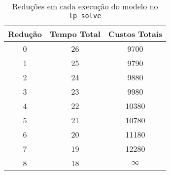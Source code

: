 \begin{table}[H]
\centering
\begin{tabular}{c c c}
\toprule
	Redução & Tempo Total & Custos Totais \\ 
\midrule
0&  26& 9700  \\ 
1&  25& 9790  \\
2&  24& 9880  \\
3&  23& 9980  \\
4&  22& 10380 \\
5&  21& 10780 \\
6&  20& 11180 \\
7&  19& 12280 \\
8&  18& $\infty$\\ 
\bottomrule
\end{tabular}
\caption{Reduções em cada execução do modelo no \texttt{lp\_solve}}
\label{p4:tab:custos}
\end{table}

